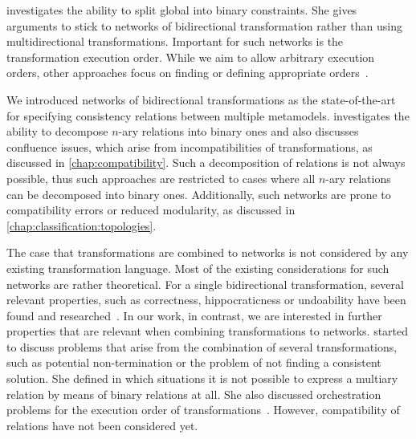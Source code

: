 \textcite{stevens2020BidirectionalTransformationLarge-SoSym} investigates the ability to split global into binary constraints.
She gives arguments to stick to networks of bidirectional transformation rather than using multidirectional transformations. %
Important for such networks is the transformation execution order. 
While we aim to allow arbitrary execution orders, other approaches focus on finding or defining appropriate orders~\cite{stevens2020BuildingFromMegamodels-SoSym}.

We introduced networks of bidirectional transformations as the state-of-the-art for specifying consistency relations between multiple metamodels.
\textcite{stevens2020BidirectionalTransformationLarge-SoSym} investigates the ability to decompose $n$-ary relations into binary ones and also discusses confluence issues, which arise from incompatibilities of transformations, as discussed in \autoref{chap:compatibility}.
Such a decomposition of relations is not always possible, thus such approaches are restricted to cases where all $n$-ary relations can be decomposed into binary ones.
Additionally, such networks are prone to compatibility errors or reduced modularity, as discussed in \autoref{chap:classification:topologies}.

The case that transformations are combined to networks is not considered by any existing transformation language.
Most of the existing considerations for such networks are rather theoretical.
For a single bidirectional transformation, several relevant properties, such as correctness, hippocraticness or undoability have been found and researched~\cite{stevens2010sosym}.
In our work, in contrast, we are interested in further properties that are relevant when combining transformations to networks.
\textcite{stevens2020BidirectionalTransformationLarge-SoSym} started to discuss problems that arise from the combination of several transformations, such as potential non-termination or the problem of not finding a consistent solution. She defined in which situations it is not possible to express a multiary relation by means of binary relations at all.
She also discussed orchestration problems for the execution order of transformations~\cite{stevens2020BuildingFromMegamodels-SoSym}.
However, compatibility of relations %
have not been considered yet.

